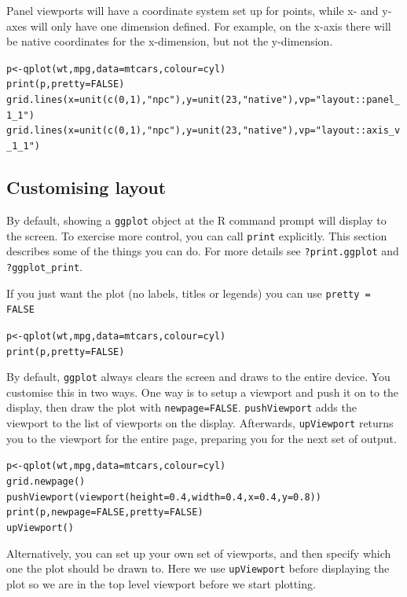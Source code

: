 Panel viewports will have a coordinate system set up for points, while x- and y- axes will only have one dimension defined.  For example, on the x-axis there will be native coordinates for the x-dimension, but not the y-dimension.

\begin{alltt}
p <- qplot(wt, mpg, data=mtcars, colour=cyl)
print(p, pretty=FALSE)
grid.lines(x=unit(c(0,1), "npc"), y=unit(23, "native"), vp="layout::panel_1_1")
grid.lines(x=unit(c(0,1), "npc"), y=unit(23, "native"), vp="layout::axis_v_1_1")
\end{alltt}



\subsection{Customising layout}\label{sec:grid_layout}

By default, showing a {\tt ggplot} object at the R command prompt will display to the screen.  To exercise more control, you can call {\tt print} explicitly.  This section describes some of the things you can do.  For more details see {\tt ?print.ggplot} and {\tt ?ggplot\_print}.

If you just want the plot (no labels, titles or legends) you can use {\tt pretty = FALSE}

\begin{alltt}
p <- qplot(wt, mpg, data=mtcars, colour=cyl)
print(p, pretty = FALSE)
\end{alltt}

By default, {\tt ggplot} always clears the screen and draws to the entire device.  You customise this in two ways. One way is to setup a viewport and push it on to the display, then draw the plot with {\tt newpage=FALSE}. {\tt pushViewport} adds the viewport to the list of viewports on the display.   Afterwards, {\tt upViewport} returns you to the viewport for the entire page, preparing you for the next set of output.

\begin{alltt}
p <- qplot(wt, mpg, data=mtcars, colour=cyl)
grid.newpage()
pushViewport(viewport(height=0.4, width=0.4, x=0.4, y=0.8))
print(p, newpage=FALSE, pretty=FALSE)
upViewport()
\end{alltt}

Alternatively, you can set up your own set of viewports, and then specify which one the plot should be drawn to.  Here we use {\tt upViewport} before displaying the plot so we are in the top level viewport before we start plotting.

